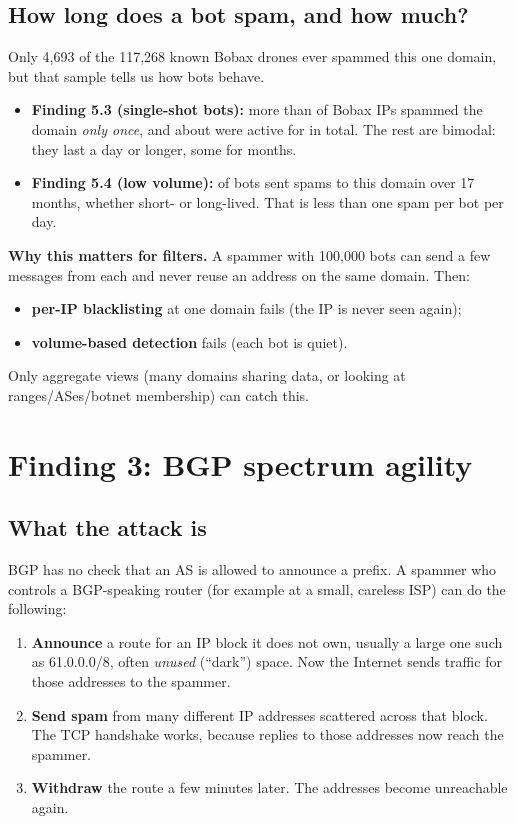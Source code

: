 \subsection{How long does a bot spam, and how much?}
Only 4,693 of the 117,268 known Bobax drones ever spammed this one domain, but that sample tells us how bots behave.


\begin{itemize}
  \item \textbf{Finding 5.3 (single-shot bots):} more than  of Bobax IPs spammed the domain \emph{only once}, and about  were active
        for  in total. The rest are bimodal: they last a day or longer, some for months.
  \item \textbf{Finding 5.4 (low volume):}  of bots sent  spams to this domain over 17 months, whether short- or long-lived.
        That is less than one spam per bot per day.
\end{itemize}

\textbf{Why this matters for filters.} A spammer with 100,000 bots can send a few messages from each and never reuse an address on the same
domain. Then:
\begin{itemize}
  \item \textbf{per-IP blacklisting} at one domain fails (the IP is never seen again);
  \item \textbf{volume-based detection} fails (each bot is quiet).
\end{itemize}
Only aggregate views (many domains sharing data, or looking at ranges/ASes/botnet membership) can catch this.

\section{Finding 3: BGP spectrum agility}

\subsection{What the attack is}
BGP has no check that an AS is allowed to announce a prefix. A spammer who controls a BGP-speaking router (for example at a small, careless ISP)
can do the following:
\begin{enumerate}
  \item \textbf{Announce} a route for an IP block it does not own, usually a large one such as 61.0.0.0/8, often \emph{unused} (``dark'') space.
        Now the Internet sends traffic for those addresses to the spammer.
  \item \textbf{Send spam} from many different IP addresses scattered across that block. The TCP handshake works, because replies to those
        addresses now reach the spammer.
  \item \textbf{Withdraw} the route a few minutes later. The addresses become unreachable again.
\end{enumerate}

